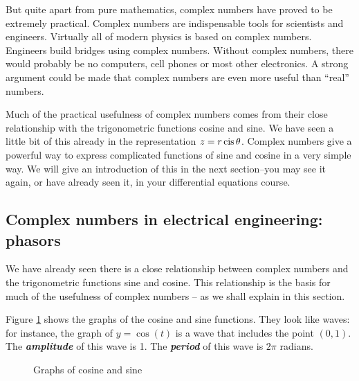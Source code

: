 But quite apart from pure mathematics, complex numbers have proved to be extremely practical. Complex numbers are indispensable tools for
scientists and engineers. Virtually all of modern physics is based
on complex numbers. Engineers build bridges using complex numbers.
Without complex numbers, there would probably be no computers, cell
phones or most other electronics. A strong argument could be made that complex numbers are even more useful than ``real'' numbers.

Much of the practical usefulness of complex numbers comes from their close relationship
with the trigonometric functions cosine and sine. We have seen a little
bit of this already in the representation $z=r\operatorname{cis}\theta$.
Complex numbers give a powerful way to express complicated functions
of sine and cosine in a very simple way. We will give an introduction of this in the next section--you may see it again, or have already seen it, in your differential equations course.

\subsection{Complex numbers in electrical engineering: phasors}

We have already seen there is a close relationship between complex numbers and the trigonometric functions sine and cosine. This relationship is the basis for much of the usefulness of complex numbers -- as we shall explain in this section.

Figure \ref{fig:complex:1} shows the graphs of the cosine and sine functions.  They look like waves: for instance, the graph of $y = \cos(t)$ is a wave that includes the point $(0,1)$. The {\bf \emph{amplitude}} of this wave is 1. The {\bf \emph{period}} of this wave is $2\pi$ radians. 

\begin{figure}[htb]
	  \caption{\label{fig:complex:1} Graphs of cosine and sine }
\end{figure}


